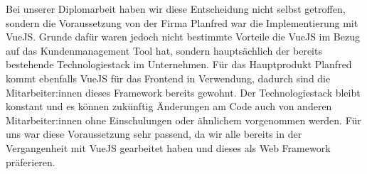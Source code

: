 Bei unserer Diplomarbeit haben wir diese Entscheidung nicht selbst getroffen, sondern die Voraussetzung von der Firma Planfred war die Implementierung mit VueJS. Grunde dafür waren jedoch nicht bestimmte Vorteile die VueJS im Bezug auf das Kundenmanagement Tool hat, sondern hauptsächlich der bereits bestehende Technologiestack im Unternehmen. 
Für das Hauptprodukt Planfred kommt ebenfalls VueJS für das Frontend in Verwendung, dadurch sind die Mitarbeiter:innen dieses Framework bereits gewohnt. 
Der Technologiestack bleibt konstant und es können zukünftig Änderungen am Code auch von anderen Mitarbeiter:innen ohne Einschulungen oder ähnlichem vorgenommen werden.
Für uns war diese Voraussetzung sehr passend, da wir alle bereits in der Vergangenheit mit VueJS gearbeitet haben und dieses als Web Framework präferieren.